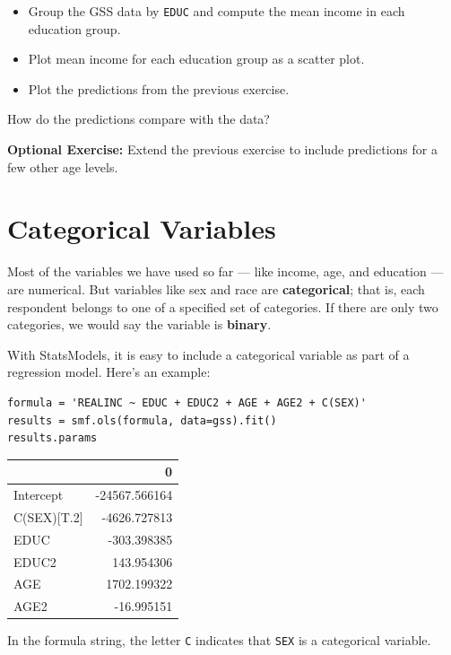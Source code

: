 \begin{itemize}
\item
  Group the GSS data by \passthrough{\lstinline!EDUC!} and compute the
  mean income in each education group.
\item
  Plot mean income for each education group as a scatter plot.
\item
  Plot the predictions from the previous exercise.
\end{itemize}

How do the predictions compare with the data?

\textbf{Optional Exercise:} Extend the previous exercise to include
predictions for a few other age levels.

\hypertarget{categorical-variables}{%
\section{Categorical Variables}\label{categorical-variables}}

Most of the variables we have used so far --- like income, age, and
education --- are numerical. But variables like sex and race are
\textbf{categorical}; that is, each respondent belongs to one of a
specified set of categories. If there are only two categories, we would
say the variable is \textbf{binary}.

With StatsModels, it is easy to include a categorical variable as part
of a regression model. Here's an example:

\begin{lstlisting}[]
formula = 'REALINC ~ EDUC + EDUC2 + AGE + AGE2 + C(SEX)'
results = smf.ols(formula, data=gss).fit()
results.params
\end{lstlisting}

\begin{tabular}{lr}
\midrule
{} &             0 \\
\midrule
Intercept   & -24567.566164 \\
C(SEX)[T.2] &  -4626.727813 \\
EDUC        &   -303.398385 \\
EDUC2       &    143.954306 \\
AGE         &   1702.199322 \\
AGE2        &    -16.995151 \\
\midrule
\end{tabular}

In the formula string, the letter \passthrough{\lstinline!C!} indicates
that \passthrough{\lstinline!SEX!} is a categorical variable.

